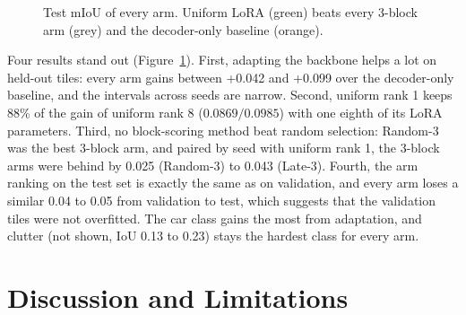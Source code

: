 \documentclass[11pt,a4paper]{report}
\begin{document}
\begin{figure}[t]
\centering
{}
\caption{Test mIoU of every arm. Uniform LoRA (green) beats every 3-block arm (grey) and the decoder-only baseline (orange).}
\label{fig:testarms}
\end{figure}

Four results stand out (Figure~\ref{fig:testarms}). First, adapting the backbone helps a lot on held-out tiles: every arm gains between +0.042 and +0.099 over the decoder-only baseline, and the intervals across seeds are narrow. Second, uniform rank 1 keeps 88\% of the gain of uniform rank 8 ($0.0869 / 0.0985$) with one eighth of its LoRA parameters. Third, no block-scoring method beat random selection: Random-3 was the best 3-block arm, and paired by seed with uniform rank 1, the 3-block arms were behind by 0.025 (Random-3) to 0.043 (Late-3). Fourth, the arm ranking on the test set is exactly the same as on validation, and every arm loses a similar 0.04 to 0.05 from validation to test, which suggests that the validation tiles were not overfitted. The car class gains the most from adaptation, and clutter (not shown, IoU 0.13 to 0.23) stays the hardest class for every arm.


\chapter{Discussion and Limitations}
\label{ch:discussion}
\end{document}

